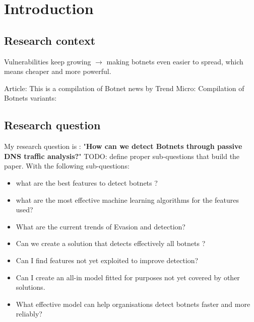 
\chapter{Introduction} %

\label{Introduction} %


\newcommand{\keyword}[1]{\textbf{#1}}
\newcommand{\tabhead}[1]{\textbf{#1}}
\newcommand{\code}[1]{\texttt{#1}}
\newcommand{\file}[1]{\texttt{\bfseries#1}}
\newcommand{\option}[1]{\texttt{\itshape#1}}

\section{Research context}
Vulnerabilities keep growing $\rightarrow$ making botnets even easier to spread, which means cheaper and more powerful.\cite{article1}

Article: \cite{trends1}
\cite{CRC_Botnets}
\cite{Botnet-def}
\cite{trends2}
\cite{cyberthreat}
\cite{iot}
\cite{botnet-families}
This is a compilation of Botnet news by Trend Micro: \cite{trends3}
Compilation of Botnets variants: \cite{variants}
\cite{mirai}
\cite{mylobot} %
\section{Research question}
My research question is : "\textbf{How can we detect Botnets through passive DNS traffic analysis?}"
TODO: define proper sub-questions that build the paper.
With the following sub-questions:
\begin{itemize}
\item what are the best features to detect botnets ?
\item what are the most effective machine learning algorithms for the features used?
\item What are the current trends of Evasion and detection?
\item Can we create a solution that detects effectively all botnets ?
\item Can I find features not yet exploited to improve detection?
\item Can I create an all-in model fitted for purposes not yet covered by other solutions.
\item What effective model can help organisations detect botnets faster and more reliably?
\end{itemize}
